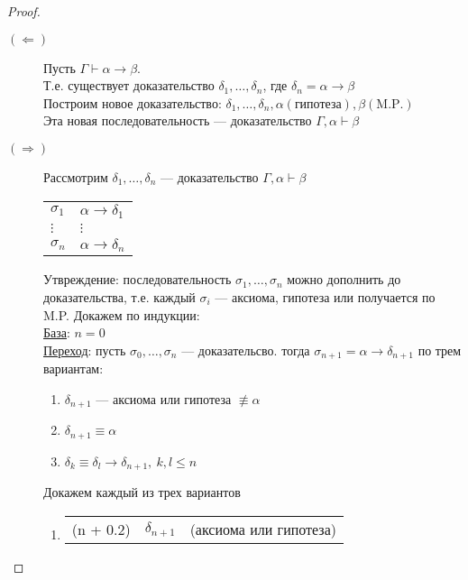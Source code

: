 \documentclass[oneside]{book}
\begin{document}
\begin{proof}
	\-
	\begin{description}
		\item[{\((\Leftarrow)\)}] Пусть \(\Gamma \vdash \alpha \to \beta\). \\
			Т.е. существует доказательство \(\delta_1, \dots, \delta_n\), где \(\delta_n = \alpha \to \beta\) \\
			Построим новое доказательство: \(\delta_1, \dots, \delta_n, \alpha(\text{гипотеза}), \beta(\text{M.P.})\) \\
			Эта новая последовательность --- доказательство \(\Gamma, \alpha \vdash \beta\)
		\item[{\((\Rightarrow)\)}] Рассмотрим \(\delta_1, \dots, \delta_n\) --- доказательство \(\Gamma, \alpha \vdash \beta\)
			\begin{center}
				\begin{tabular}{ll}
					\(\sigma_1\) & \(\alpha \to \delta_1\) \\
					\(\vdots\)   & \(\vdots\)              \\
					\(\sigma_n\) & \(\alpha \to \delta_n\) \\
				\end{tabular}
			\end{center}
			Утвреждение: последовательность \(\sigma_1, \dots, \sigma_n\) можно дополнить до доказательства, т.е. каждый \(\sigma_i\) --- аксиома, гипотеза или получается по M.P. Докажем по индукции: \\
			\uline{База}: \(n = 0\) \\
			\uline{Переход}: пусть \(\sigma_0, \dots, \sigma_n\) --- доказательсво. тогда \(\sigma_{n + 1} = \alpha \to \delta_{n + 1}\) по трем вариантам:
			\begin{enumerate}
				\item \(\delta_{n + 1}\) --- аксиома или гипотеза \(\not\equiv \alpha\)
				\item \(\delta_{n + 1} \equiv \alpha\)
				\item \(\delta_k \equiv \delta_l \to \delta_{n + 1},\ k,l\le n\)
			\end{enumerate}
			Докажем каждый из трех вариантов
			\begin{enumerate}
				\item \-
				      \begin{center}
					      \begin{tabular}{l|ll}
						      (n + 0.2) & \(\delta_{n + 1}\)                              & (аксиома или гипотеза)      \\

\end{tabular}
\end{center}
\end{enumerate}
\end{description}
\end{proof}
\end{document}
